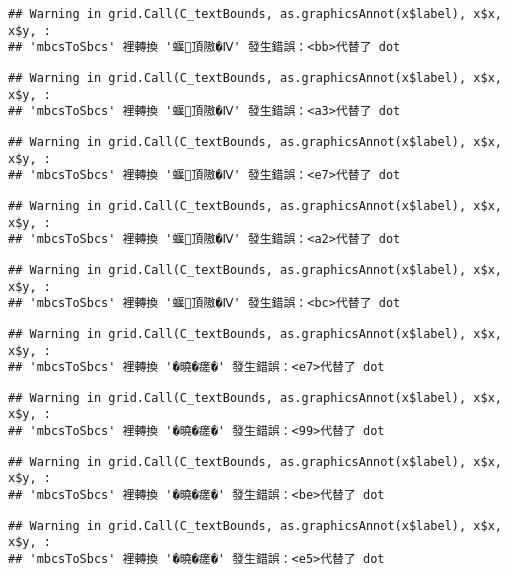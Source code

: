 \documentclass[
]{article}
\begin{document}
\begin{verbatim}
## Warning in grid.Call(C_textBounds, as.graphicsAnnot(x$label), x$x, x$y, :
## 'mbcsToSbcs' 裡轉換 '蝘頂隞�Ⅳ' 發生錯誤：<bb>代替了 dot
\end{verbatim}

\begin{verbatim}
## Warning in grid.Call(C_textBounds, as.graphicsAnnot(x$label), x$x, x$y, :
## 'mbcsToSbcs' 裡轉換 '蝘頂隞�Ⅳ' 發生錯誤：<a3>代替了 dot
\end{verbatim}

\begin{verbatim}
## Warning in grid.Call(C_textBounds, as.graphicsAnnot(x$label), x$x, x$y, :
## 'mbcsToSbcs' 裡轉換 '蝘頂隞�Ⅳ' 發生錯誤：<e7>代替了 dot
\end{verbatim}

\begin{verbatim}
## Warning in grid.Call(C_textBounds, as.graphicsAnnot(x$label), x$x, x$y, :
## 'mbcsToSbcs' 裡轉換 '蝘頂隞�Ⅳ' 發生錯誤：<a2>代替了 dot
\end{verbatim}

\begin{verbatim}
## Warning in grid.Call(C_textBounds, as.graphicsAnnot(x$label), x$x, x$y, :
## 'mbcsToSbcs' 裡轉換 '蝘頂隞�Ⅳ' 發生錯誤：<bc>代替了 dot
\end{verbatim}

\begin{verbatim}
## Warning in grid.Call(C_textBounds, as.graphicsAnnot(x$label), x$x, x$y, :
## 'mbcsToSbcs' 裡轉換 '�曉�瘥�' 發生錯誤：<e7>代替了 dot
\end{verbatim}

\begin{verbatim}
## Warning in grid.Call(C_textBounds, as.graphicsAnnot(x$label), x$x, x$y, :
## 'mbcsToSbcs' 裡轉換 '�曉�瘥�' 發生錯誤：<99>代替了 dot
\end{verbatim}

\begin{verbatim}
## Warning in grid.Call(C_textBounds, as.graphicsAnnot(x$label), x$x, x$y, :
## 'mbcsToSbcs' 裡轉換 '�曉�瘥�' 發生錯誤：<be>代替了 dot
\end{verbatim}

\begin{verbatim}
## Warning in grid.Call(C_textBounds, as.graphicsAnnot(x$label), x$x, x$y, :
## 'mbcsToSbcs' 裡轉換 '�曉�瘥�' 發生錯誤：<e5>代替了 dot
\end{verbatim}
\end{document}

